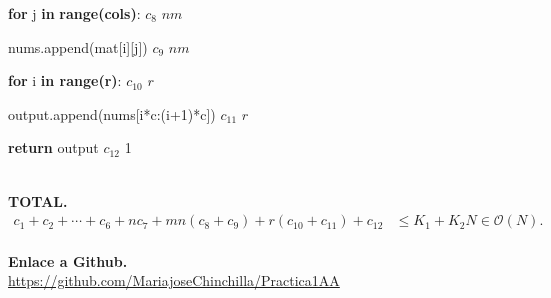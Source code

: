 \documentclass{article}
\newcommand{\bigO}{\mathcal{O}} %
\begin{document}
\begin{algorithm}
\begin{algorithmic}
                \item \hspace{1.6cm} \textbf{for} j \textbf{in} \textbf{range(cols)}: \hspace{3.75cm} $c_8$ \hspace{1.1cm} $nm$
                    \item \hspace{1.9cm} nums.append(mat[i][j]) \hspace{3.25cm} $c_9$ \hspace{1.1cm} $nm$
            \item \hspace{1.2cm} \textbf{for} i \textbf{in range(r)}: \hspace{4.55cm} $c_{10}$ \hspace{1.1cm} $r$
                \item \hspace{1.6cm} output.append(nums[i*c:(i+1)*c]) \hspace{1.8cm} $c_{11}$ \hspace{1.1cm} $r$
            \item \hspace{1.2cm} \textbf{return} output \hspace{5.2cm} $c_{12}$ \hspace{1.05cm} 1
\end{algorithmic}
\end{algorithm} \\
\textbf{TOTAL.} 
\begin{align*}
    c_1+c_2+\cdots + c_6 + nc_7 + mn(c_8+c_9)+r(c_{10}+c_{11}) + c_{12} &\leq K_1 + K_2N \in \bigO(N).
\end{align*}
\\
\textbf{Enlace a Github.} \\
\url{https://github.com/MariajoseChinchilla/Practica1AA}
\end{document}
